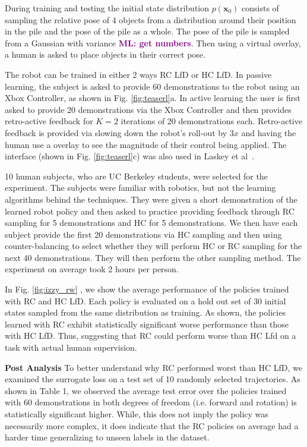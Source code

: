 \documentclass[10pt, conference]{ieeeconf}      %
\newcommand{\bx}{\mathbf{x}}
\newcommand{\mlnote}[1]{\ifthenelse{ \boolean{include-notes}}%
 {\textcolor{purple}{\textbf{ML: #1}}}{}}
\begin{document}
During training and testing the initial state distribution $p(\bx_0)$ consists of sampling the relative pose of 4 objects from a distribution around their position in the pile and the pose of the pile as a whole. The pose of the pile is sampled from a Gaussian with variance \mlnote{get numbers}. Then using a virtual overlay,  a human is asked to place objects in their correct pose. 

The robot can be trained in either 2 ways RC LfD or HC LfD. In passive learning, the subject is asked to provide 60 demonstrations to the robot using an Xbox Controller, as shown in Fig. \ref{fig:teaserl}a. In active learning the user is first asked to provide 20 demonstrations via the Xbox Controller and then provides retro-active feedback for $K=2$ iterations of 20 demonstrations each. Retro-active feedback is provided via slowing down the robot's roll-out by $3x$ and having the human use a overlay to see the magnitude of their control being applied. The interface (shown in Fig. \ref{fig:teaserl}c) was also used in Laskey et al~\cite{laskeyrobot}.

10 human subjects, who are UC Berkeley students, were selected for the experiment. The subjects were familiar with robotics, but not the learning algorithms behind the techniques. They were given a short demonstration of the learned robot policy and then asked to practice providing feedback through RC sampling for 5 demonstrations and HC for 5 demonstrations. We then have each subject provide the first 20 demonstrations via HC sampling and then using counter-balancing to select whether they will perform HC or RC sampling for the next 40 demonstrations.  They will then perform the other sampling method. The experiment on average took 2 hours per person. 

In Fig. \ref{fig:izzy_rw} , we show the average performance of the policies trained with RC and HC LfD. Each policy is evaluated on a hold out set of 30 initial states sampled from the same distribution as training. As shown, the policies learned with RC exhibit statistically significant worse performance than those with HC LfD. Thus, suggesting that RC could perform worse than HC Lfd on a task with actual human supervision. 

\noindent \textbf{Post Analysis}
To better understand why RC performed worst than HC LfD, we examined the surrogate loss on a test set of 10 randomly selected trajectories.  As shown in Table 1, we observed the average test error over the policies trained with 60 demonstrations in both degrees of freedom (i.e. forward and rotation) is statistically significant higher. While, this does not imply the policy was necessarily more complex, it does indicate that the RC policies on average had a harder time generalizing to unseen labels in the dataset. 
\end{document}
